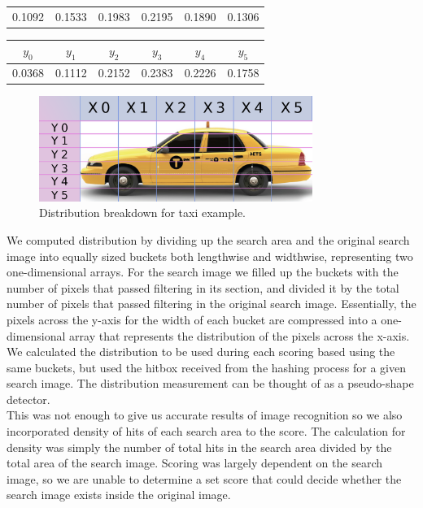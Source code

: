 \documentclass[10pt, journal]{vgtc}                %
\newcommand\tab[1][1cm]{\hspace*{#1}}
\begin{document}
\begin{flushleft}
\begin{table}[h!]
\begin{center}
\begin{tabular}{cccccc}
			0.1092 &  0.1533 & 0.1983 & 0.2195 & 0.1890 & 0.1306 \\
		\end{tabular}
	\end{center}
	\begin{center}
		\begin{tabular}{cccccc}
			$y_0$ & $y_1$ & $y_2$ & $y_3$ & $y_4$  & $y_5$\\
			\hline
			0.0368 &  0.1112 & 0.2152 & 0.2383 & 0.2226 & 0.1758 \\
		\end{tabular}
\end{center}
\end{table}
\begin{figure}[h!]
\centering
\includegraphics[width=3.5in]{distribution.png}
\caption{Distribution breakdown for taxi example.}
\end{figure}
\tab We computed distribution by dividing up the search area and the original search image into equally sized buckets both lengthwise and widthwise, representing two one-dimensional arrays. For the search image we filled up the buckets with the number of pixels that passed filtering in its section, and divided it by the total number of pixels that passed filtering in the original search image. Essentially, the pixels across the y-axis for the width of each bucket are compressed into a one-dimensional array that represents the distribution of the pixels across the x-axis. We calculated the distribution to be used during each scoring based using the same buckets, but used the hitbox received from the hashing process for a given search image. The distribution measurement can be thought of as a pseudo-shape detector.\\\smallskip
\tab This was not enough to give us accurate results of image recognition so we also incorporated density of hits of each search area to the score. The calculation for density was simply the number of total hits in the search area divided by the total area of the search image. Scoring was largely dependent on the search image, so we are unable to determine a set score that could decide whether the search image exists inside the original image.

\end{flushleft}
\end{document}
